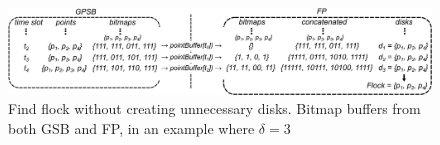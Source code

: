 \begin{figure}
    \centering
    \includegraphics[width=\linewidth]{images/flow.png}
    \caption{Find flock without creating unnecessary disks. Bitmap buffers from both GSB and FP, in an example where
        $\delta = 3$}
    \label{fig:flow}
\end{figure}

